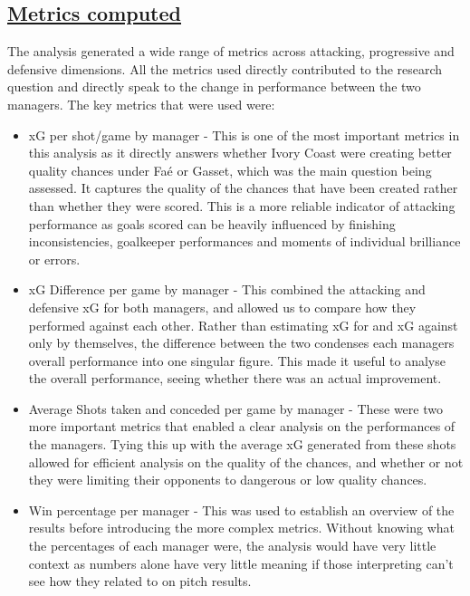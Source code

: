 \documentclass[
  11pt,
  letterpaper,
  DIV=11,
  numbers=noendperiod]{scrartcl}
\begin{document}
\subsection{\texorpdfstring{\ul{Metrics
computed}}{Metrics computed}}\label{metrics-computed}

The analysis generated a wide range of metrics across attacking,
progressive and defensive dimensions. All the metrics used directly
contributed to the research question and directly speak to the change in
performance between the two managers. The key metrics that were used
were:

\begin{itemize}
\item
  xG per shot/game by manager - This is one of the most important
  metrics in this analysis as it directly answers whether Ivory Coast
  were creating better quality chances under Faé or Gasset, which was
  the main question being assessed. It captures the quality of the
  chances that have been created rather than whether they were scored.
  This is a more reliable indicator of attacking performance as goals
  scored can be heavily influenced by finishing inconsistencies,
  goalkeeper performances and moments of individual brilliance or
  errors.
\item
  xG Difference per game by manager - This combined the attacking and
  defensive xG for both managers, and allowed us to compare how they
  performed against each other. Rather than estimating xG for and xG
  against only by themselves, the difference between the two condenses
  each managers overall performance into one singular figure. This made
  it useful to analyse the overall performance, seeing whether there was
  an actual improvement.
\item
  Average Shots taken and conceded per game by manager - These were two
  more important metrics that enabled a clear analysis on the
  performances of the managers. Tying this up with the average xG
  generated from these shots allowed for efficient analysis on the
  quality of the chances, and whether or not they were limiting their
  opponents to dangerous or low quality chances.
\item
  Win percentage per manager - This was used to establish an overview of
  the results before introducing the more complex metrics. Without
  knowing what the percentages of each manager were, the analysis would
  have very little context as numbers alone have very little meaning if
  those interpreting can't see how they related to on pitch results.

\end{itemize}
\end{document}
